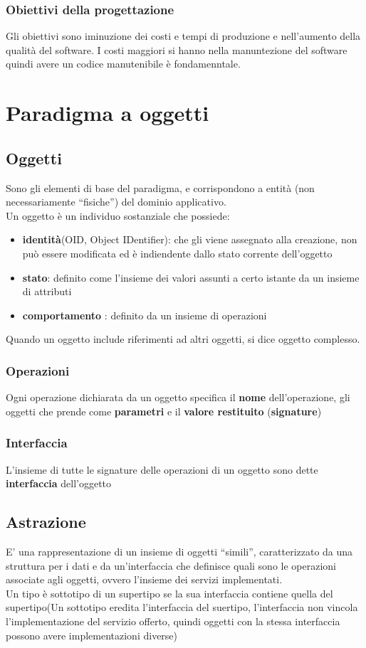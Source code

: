 \documentclass{report}
\begin{document}
            \subsection{Obiettivi della progettazione}
                Gli obiettivi sono iminuzione dei costi e tempi di produzione e nell'aumento della qualità del software. 
                I costi maggiori si hanno nella manuntezione del software quindi avere un codice manutenibile è fondamenntale.
    \chapter{Paradigma a oggetti}
        \section{Oggetti}
            Sono gli elementi di base del paradigma, e corrispondono a entità (non necessariamente “fisiche”) del dominio applicativo. 
            \\
            Un oggetto è un individuo sostanziale che possiede:
            \begin{itemize}
                \item \textbf{identità}(OID, Object IDentifier): che gli viene assegnato alla creazione, non può essere modificata ed è indiendente dallo stato corrente dell'oggetto
                \item \textbf{stato}: definito come l'insieme dei valori assunti a certo istante da un insieme di attributi
                \item \textbf{comportamento} : definito da un insieme di operazioni
            \end{itemize}
            Quando un oggetto include riferimenti ad altri oggetti, si dice oggetto complesso. 
            \subsection{Operazioni}
                Ogni operazione dichiarata da un oggetto specifica il \textbf{nome} dell'operazione, gli oggetti che prende come \textbf{parametri} e il \textbf{valore restituito} (\textbf{signature})
            \subsection{Interfaccia}
                L'insieme di tutte le signature delle operazioni di un oggetto sono dette \textbf{interfaccia} dell'oggetto
        \section{Astrazione}
            E’ una rappresentazione di un insieme di oggetti “simili”, caratterizzato da una struttura per i dati e da un’interfaccia che definisce quali sono le operazioni associate agli oggetti, ovvero l’insieme dei servizi implementati.
            \\
            Un tipo è sottotipo di un supertipo se la sua interfaccia contiene quella del supertipo(Un sottotipo eredita l'interfaccia del suertipo, l'interfaccia non vincola l'implementazione del servizio  offerto, quindi oggetti con la stessa interfaccia possono avere implementazioni diverse)
\end{document}
